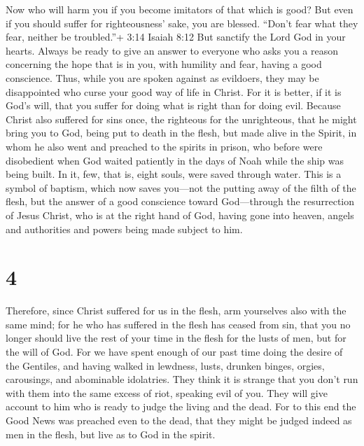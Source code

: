  Now who will harm you if you become imitators of that
which is good?  But even if you should suffer for
righteousness' sake, you are blessed. ``Don't fear what they fear,
neither be troubled.''+ 3:14 Isaiah 8:12  But sanctify the
Lord God in your hearts. Always be ready to give an answer to everyone
who asks you a reason concerning the hope that is in you, with humility
and fear,  having a good conscience. Thus, while you are
spoken against as evildoers, they may be disappointed who curse your
good way of life in Christ.  For it is better, if it is
God's will, that you suffer for doing what is right than for doing evil.
 Because Christ also suffered for sins once, the righteous
for the unrighteous, that he might bring you to God, being put to death
in the flesh, but made alive in the Spirit,  in whom he
also went and preached to the spirits in prison,  who
before were disobedient when God waited patiently in the days of Noah
while the ship was being built. In it, few, that is, eight souls, were
saved through water.  This is a symbol of baptism, which
now saves you---not the putting away of the filth of the flesh, but the
answer of a good conscience toward God---through the resurrection of
Jesus Christ,  who is at the right hand of God, having gone
into heaven, angels and authorities and powers being made subject to
him.

\hypertarget{section-3}{%
\section{4}\label{section-3}}

 Therefore, since Christ suffered for us in the flesh, arm
yourselves also with the same mind; for he who has suffered in the flesh
has ceased from sin,  that you no longer should live the
rest of your time in the flesh for the lusts of men, but for the will of
God.  For we have spent enough of our past time doing the
desire of the Gentiles, and having walked in lewdness, lusts, drunken
binges, orgies, carousings, and abominable idolatries.  They
think it is strange that you don't run with them into the same excess of
riot, speaking evil of you.  They will give account to him
who is ready to judge the living and the dead.  For to this
end the Good News was preached even to the dead, that they might be
judged indeed as men in the flesh, but live as to God in the spirit.

